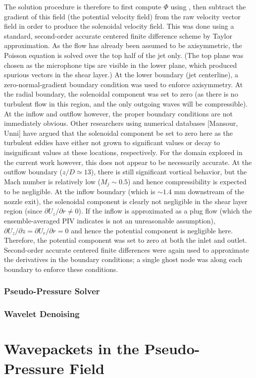 The solution procedure is therefore to first compute $\Phi$ using , then subtract the gradient of this field (the potential velocity field) from the raw velocity vector field in order to produce the solenoidal velocity field. 
This was done using a standard, second-order accurate centered finite difference scheme by Taylor approximation.
As the flow has already been assumed to be axisymmetric, the Poisson equation is solved over the top half of the jet only.
(The top plane was chosen as the microphone tips are visible in the lower plane, which produced spurious vectors in the shear layer.)
At the lower boundary (jet centerline), a zero-normal-gradient boundary condition was used to enforce axisymmetry.
At the radial boundary, the solenoidal component was set to zero (as there is no turbulent flow in this region, and the only outgoing waves will be compressible).
At the inflow and outflow however, the proper boundary conditions are not immediately obvious.
Other researchers using numerical databases [Mansour, Unni] have argued that the solenoidal component be set to zero here as the turbulent eddies have either not grown to significant values or decay to insignificant values at these locations, respectively.
For the domain explored in the current work however, this does not appear to be necessarily accurate.
At the outflow boundary ($z/D \simeq 13$), there is still significant vortical behavior, but the Mach number is relatively low ($M_j \sim 0.5$) and hence compressibility is expected to be negligible.
At the inflow boundary (which is $\sim1.4$ mm downstream of the nozzle exit), the solenoidal component is clearly not negligible in the shear layer region (since $\partial U_z / \partial r \neq 0$).
If the inflow is approximated as a plug flow (which the ensemble-averaged PIV indicates is not an unreasonable assumption), $\partial U_z / \partial z = \partial U_r / \partial r = 0$ and hence the potential component is negligible here.
Therefore, the potential component was set to zero at both the inlet and outlet.
Second-order accurate centered finite differences were again used to approximate the derivatives in the boundary conditions; a single ghost node was along each boundary to enforce these conditions.
\subsubsection{Pseudo-Pressure Solver}
\subsubsection{Wavelet Denoising}
\section{Wavepackets in the Pseudo-Pressure Field}